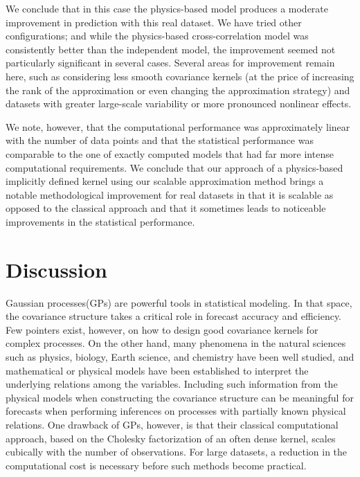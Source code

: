 \documentclass[article,ij4uq]{ij4uq}              %
\begin{document}
We conclude that in this case the physics-based model produces a moderate improvement in prediction with this real dataset. We have tried other configurations; and while the physics-based cross-correlation model was consistently better than the independent model, the improvement seemed not particularly significant in several cases. Several areas for improvement remain here, such as considering less smooth covariance kernels (at the price of increasing the rank of the approximation or even changing the approximation strategy) and datasets with greater large-scale variability or more pronounced nonlinear effects. 

We note, however, that the computational performance was approximately linear with the number of data points and that the statistical performance was comparable to the one of exactly computed models that had far more intense computational requirements. We conclude that our approach of a physics-based implicitly defined kernel using our scalable approximation method brings a notable methodological improvement for real datasets in that it is scalable as opposed to the classical approach and that it sometimes leads to noticeable improvements in the statistical performance. 

\section{Discussion}\label{sec6}
\par Gaussian processes(GPs) are powerful tools in statistical modeling. In that space, the covariance structure takes a critical role in forecast accuracy and efficiency. Few pointers exist, however, on how to design good covariance kernels for complex processes. On the other hand, many phenomena in the natural sciences such as physics, biology, Earth science, and chemistry have been well studied, and mathematical or physical models have been established to interpret the underlying relations among the variables. Including such information from the physical models when constructing the covariance structure can be meaningful for forecasts when performing inferences on processes with partially known physical relations. One drawback of GPs, however, is that their classical computational approach, based on the Cholesky factorization of an often dense kernel, scales cubically with the number of observations. For large datasets, a reduction in the computational cost is necessary before such methods become practical.
\end{document}
